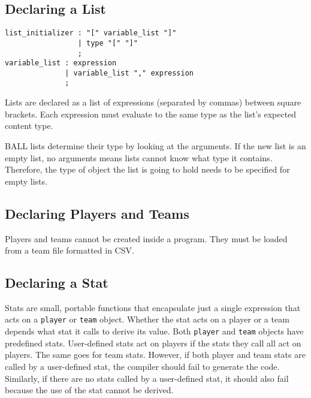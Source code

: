\subsection{Declaring a List}\label{ListDecl}

\begin{verbatim}
list_initializer : "[" variable_list "]"
                 | type "[" "]"
                 ;
variable_list : expression
              | variable_list "," expression
              ;
\end{verbatim}

Lists are declared as a list of expressions (separated by commas)
between square brackets. Each expression must evaluate to the same
type as the list's expected content type.

BALL lists determine their type by looking at the arguments. If the
new list is an empty list, no arguments means lists cannot know what
type it contains. Therefore, the type of object the list is going to
hold needs to be specified for empty lists.

\subsection{Declaring Players and Teams}

Players and teams cannot be created inside a program. They must be
loaded from a team file formatted in CSV.

\subsection{Declaring a Stat}

Stats are small, portable functions that encapsulate just a single
expression that acts on a \texttt{player} or \texttt{team}
object. Whether the stat acts on a player or a team depends what stat
it calls to derive its value. Both \texttt{player} and \texttt{team}
objects have predefined stats. User-defined stats act on players if
the stats they call all act on players. The same goes for team
stats. However, if both player and team stats are called by a
user-defined stat, the compiler should fail to generate the
code. Similarly, if there are no stats called by a user-defined stat,
it should also fail because the use of the stat cannot be derived.

